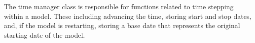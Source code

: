 
The time manager class is responsible for functions related to time
stepping within a model.  These including advancing the time, storing
start and stop dates, and, if the model is restarting, storing a 
base date that represents the original starting date of the model.  



